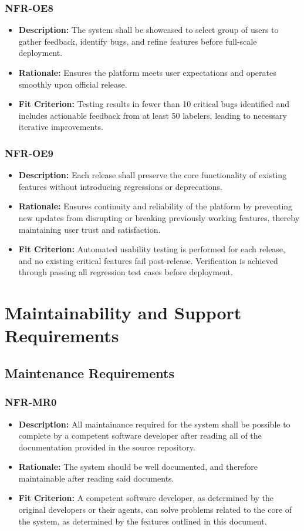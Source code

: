 \documentclass[12pt]{article}
\begin{document}
\subsubsection*{NFR-OE8}
\label{sec:OE8}
\begin{itemize}
  \item \textbf{Description:} The system shall be showcased to select group of users to gather feedback, identify bugs, and refine features before full-scale deployment.
  \item \textbf{Rationale:} Ensures the platform meets user expectations and operates smoothly upon official release.
  \item \textbf{Fit Criterion:} Testing results in fewer than 10 critical bugs identified and includes actionable feedback from at least 50 labelers, leading to necessary iterative improvements.
\end{itemize}
\subsubsection*{NFR-OE9}
\label{sec:OE9}
\begin{itemize}
  \item \textbf{Description:} Each release shall preserve the core functionality of existing features without introducing regressions or deprecations.
  \item \textbf{Rationale:} Ensures continuity and reliability of the platform by preventing new updates from disrupting or breaking previously working features, thereby maintaining user trust and satisfaction.
  \item \textbf{Fit Criterion:} Automated usability testing is performed for each release, and no existing critical features fail post-release. Verification is achieved through passing all regression test cases before deployment.
\end{itemize}


\section{Maintainability and Support Requirements}
\subsection{Maintenance Requirements}
\subsubsection*{NFR-MR0}
\label{sec:MR0}
\begin{itemize}
  \item \textbf{Description:} All maintainance required for the system shall be possible to complete by a competent software developer after reading all of the documentation provided in the source repository.
  \item \textbf{Rationale:} The system should be well documented, and therefore maintainable after reading said documents.
  \item \textbf{Fit Criterion:} A competent software developer, as determined by the original developers or their agents, can solve problems related to the core of the system, as determined by the 
  features outlined in this document.
\end{itemize}
\end{document}
